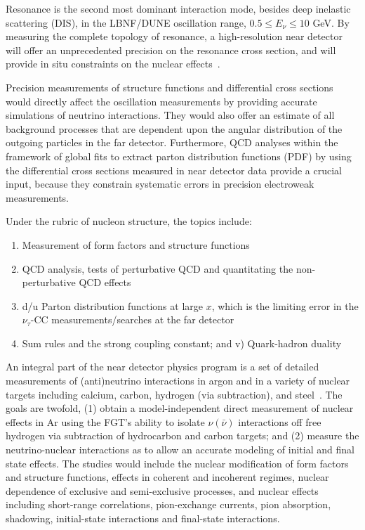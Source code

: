 Resonance is the second most dominant interaction mode, besides deep inelastic scattering (DIS),  
in the LBNF/DUNE oscillation range, $0.5 \leq E_\nu \leq 10$ GeV.
 By measuring the complete 
topology of resonance, a high-resolution near detector 
will offer an unprecedented precision on the resonance cross section, and will provide in situ constraints on the 
nuclear effects~\cite{near-detector-RES}.  


Precision measurements of  structure functions and 
differential cross sections would directly affect the oscillation measurements 
by providing accurate simulations of neutrino interactions. They would also offer an estimate of 
all background processes that are dependent upon the angular distribution of 
the outgoing particles in the far detector. 
 Furthermore, QCD analyses within the framework of global fits to 
extract parton distribution functions (PDF) by using the differential cross sections 
measured in near detector data provide a crucial input,  because they  constrain systematic errors in 
precision electroweak measurements.

Under the rubric of nucleon structure, the topics  include: 
\begin{enumerate}
\item Measurement of form factors and structure functions
\item QCD analysis,  tests of perturbative QCD and quantitating the non-perturbative 
QCD effects
\item d/u Parton distribution functions at large $x$, which is the limiting error in the 
$\nu_\tau$-CC measurements/searches at the far detector
\item Sum rules and the strong coupling constant; and v) Quark-hadron duality
\end{enumerate}

An integral part of the near detector physics program is a set of detailed measurements of (anti)neutrino 
interactions in argon and in a variety of nuclear targets including calcium, carbon, hydrogen (via subtraction), 
and steel~\cite{near-detector-NUCL}. 
The goals are twofold, (1) obtain a model-independent direct measurement of nuclear effects in Ar 
using the FGT's ability to isolate $\nu (\bar \nu)$ interactions off free hydrogen 
via subtraction of hydrocarbon and carbon targets; and
(2) measure the neutrino-nuclear interactions as to allow an accurate modeling 
of initial and final state effects. The studies would include 
the nuclear modification of form factors and structure functions, effects in coherent and incoherent 
regimes, nuclear dependence of exclusive and semi-exclusive processes, and nuclear 
effects including short-range correlations, pion-exchange currents, pion absorption, shadowing, 
initial-state interactions and final-state interactions. 

